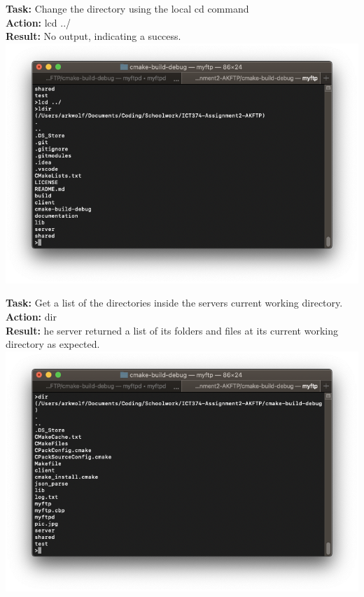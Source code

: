 \documentclass{article}
\begin{document}
\textbf{Task:} Change the directory using the local cd command\\
\textbf{Action:} lcd ../\\
\textbf{Result:} No output, indicating a success.\\
\includegraphics[width=\textwidth]{testpictures/lcd}

\textbf{Task:} Get a list of the directories inside the servers current working directory.\\
\textbf{Action:} dir\\
\textbf{Result:} he server returned a list of its folders and files at its current working directory as expected.\\
\includegraphics[width=\textwidth]{testpictures/dir}
\end{document}
